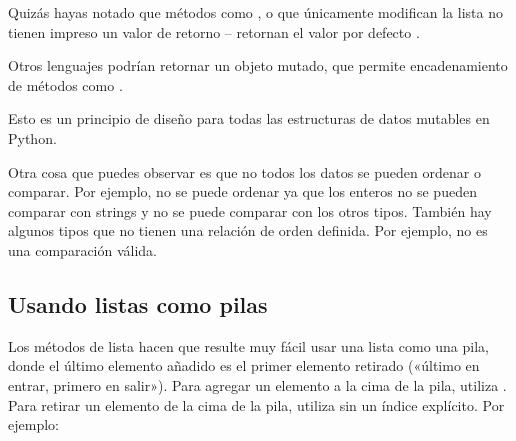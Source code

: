 \documentclass[a4,10pt,spanish]{sphinxmanual}
\begin{document}
\sphinxAtStartPar
Quizás hayas notado que métodos como ,  o  que únicamente modifican la lista no tienen impreso un valor de retorno – retornan el valor por defecto . \sphinxstepexplicit %
\begin{footnote}[1]\label{\thesphinxscope.1}%
\sphinxAtStartFootnote
Otros lenguajes podrían retornar un objeto mutado, que permite encadenamiento de métodos como .
%
\end{footnote} Esto es un principio de diseño para todas las estructuras de datos mutables en Python.

\sphinxAtStartPar
Otra cosa que puedes observar es que no todos los datos se pueden ordenar o comparar. Por ejemplo,  no se puede ordenar ya que los enteros no se pueden comparar con strings y  no se puede comparar con los otros tipos. También hay algunos tipos que no tienen una relación de orden definida. Por ejemplo,  no es una comparación válida.


\subsection{Usando listas como pilas}
\label{\detokenize{tutorial/datastructures:using-lists-as-stacks}}\label{\detokenize{tutorial/datastructures:tut-lists-as-stacks}}
\sphinxAtStartPar
Los métodos de lista hacen que resulte muy fácil usar una lista como una pila, donde el último elemento añadido es el primer elemento retirado («último en entrar, primero en salir»). Para agregar un elemento a la cima de la pila, utiliza . Para retirar un elemento de la cima de la pila, utiliza  sin un índice explícito. Por ejemplo:

\begin{sphinxVerbatim}[commandchars=\\\{\}]
  \PYG{p}{[}  \PYG{p}{]}
\end{sphinxVerbatim}
\end{document}
